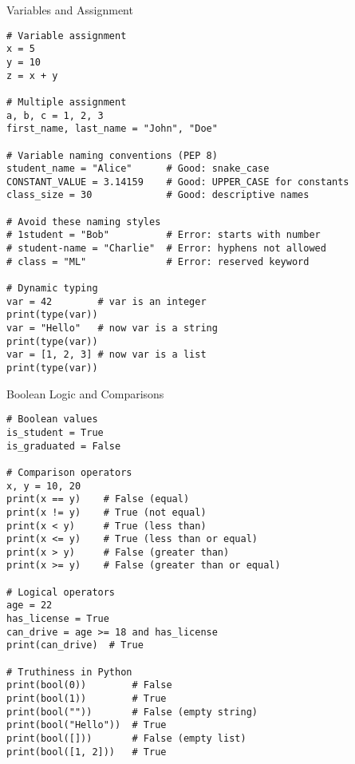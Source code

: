 \begin{frame}[fragile]{Variables and Assignment}
    \begin{codeblock}
        \begin{lstlisting}
# Variable assignment
x = 5
y = 10
z = x + y

# Multiple assignment
a, b, c = 1, 2, 3
first_name, last_name = "John", "Doe"

# Variable naming conventions (PEP 8)
student_name = "Alice"      # Good: snake_case
CONSTANT_VALUE = 3.14159    # Good: UPPER_CASE for constants
class_size = 30             # Good: descriptive names

# Avoid these naming styles
# 1student = "Bob"          # Error: starts with number
# student-name = "Charlie"  # Error: hyphens not allowed
# class = "ML"              # Error: reserved keyword

# Dynamic typing
var = 42        # var is an integer
print(type(var))
var = "Hello"   # now var is a string
print(type(var))
var = [1, 2, 3] # now var is a list
print(type(var))
        \end{lstlisting}
    \end{codeblock}
\end{frame}

\begin{frame}[fragile]{Boolean Logic and Comparisons}
    \begin{codeblock}
        \begin{lstlisting}
# Boolean values
is_student = True
is_graduated = False

# Comparison operators
x, y = 10, 20
print(x == y)    # False (equal)
print(x != y)    # True (not equal)
print(x < y)     # True (less than)
print(x <= y)    # True (less than or equal)
print(x > y)     # False (greater than)
print(x >= y)    # False (greater than or equal)

# Logical operators
age = 22
has_license = True
can_drive = age >= 18 and has_license
print(can_drive)  # True

# Truthiness in Python
print(bool(0))        # False
print(bool(1))        # True
print(bool(""))       # False (empty string)
print(bool("Hello"))  # True
print(bool([]))       # False (empty list)
print(bool([1, 2]))   # True
        \end{lstlisting}
    \end{codeblock}
\end{frame}
